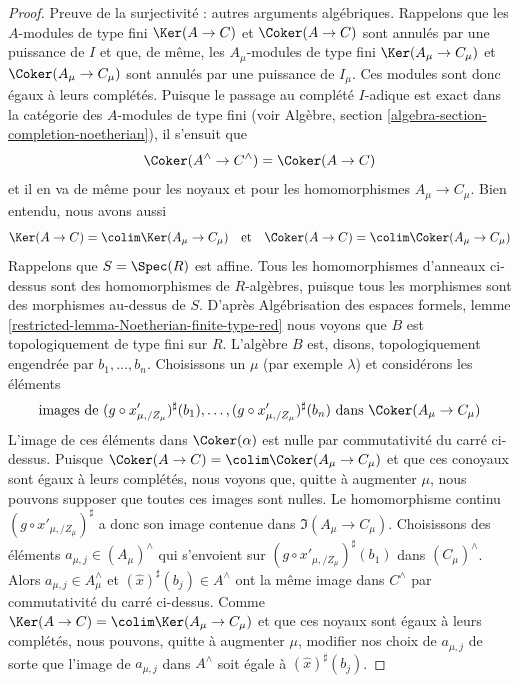 \begin{proof}
\medskip\noindent
Preuve de la surjectivité : autres arguments algébriques. Rappelons que les
$A$-modules de type fini $\Ker(A \to C)$ et $\Coker(A \to C)$ sont annulés
par une puissance de $I$ et que, de même, les $A_\mu$-modules de type fini
$\Ker(A_\mu \to C_\mu)$ et $\Coker(A_\mu \to C_\mu)$ sont annulés
par une puissance de $I_\mu$. Ces modules sont donc égaux
à leurs complétés. Puisque le passage au complété $I$-adique est exact dans
la catégorie des $A$-modules de type fini (voir
Algèbre, section \ref{algebra-section-completion-noetherian}),
il s'ensuit que
$$
\Coker(A^\wedge \to C^\wedge) = \Coker(A \to C)
$$
et il en va de même pour les noyaux et pour les homomorphismes
$A_\mu \to C_\mu$. Bien entendu, nous avons aussi
$$
\Ker(A \to C) = \colim \Ker(A_\mu \to C_\mu)
\quad\text{et}\quad
\Coker(A \to C) = \colim \Coker(A_\mu \to C_\mu)
$$
Rappelons que $S = \Spec(R)$ est affine. Tous les homomorphismes d'anneaux
ci-dessus sont des homomorphismes de $R$-algèbres, puisque tous les morphismes
sont des morphismes au-dessus de $S$. D'après
Algébrisation des espaces formels, lemme
\ref{restricted-lemma-Noetherian-finite-type-red}
nous voyons que $B$ est topologiquement de type fini sur $R$.
L'algèbre $B$ est, disons, topologiquement engendrée par $b_1, \ldots, b_n$.
Choisissons un $\mu$ (par exemple $\lambda$) et considérons
les éléments
$$
\text{images de }
(g \circ x'_{\mu, /Z_\mu})^\sharp(b_1)
, \ldots,
(g \circ x'_{\mu, /Z_\mu})^\sharp(b_n)
\text{ dans }\Coker(A_\mu \to C_\mu)
$$
L'image de ces éléments dans $\Coker(\alpha)$ est nulle
par commutativité du carré ci-dessus. Puisque
$\Coker(A \to C) = \colim \Coker(A_\mu \to C_\mu)$ et que ces
conoyaux sont égaux à leurs complétés,
nous voyons que, quitte à augmenter $\mu$, nous pouvons supposer que toutes ces
images sont nulles. Le homomorphisme continu
$(g \circ x'_{\mu, /Z_\mu})^\sharp$ a donc son image contenue
dans $\Im(A_\mu \to C_\mu)$.
Choisissons des éléments $a_{\mu, j} \in (A_\mu)^\wedge$ qui s'envoient sur
$(g \circ x'_{\mu, /Z_\mu})^\sharp(b_1)$ dans $(C_\mu)^\wedge$.
Alors $a_{\mu, j} \in A_\mu^\wedge$ et $(\hat x)^\sharp(b_j) \in A^\wedge$
ont la même image dans $C^\wedge$ par commutativité du
carré ci-dessus. Comme
$\Ker(A \to C) = \colim \Ker(A_\mu \to C_\mu)$ et que ces noyaux
sont égaux à leurs complétés, nous pouvons, quitte à augmenter
$\mu$, modifier nos choix de $a_{\mu, j}$ de sorte que
l'image de $a_{\mu, j}$ dans $A^\wedge$ soit égale à $(\hat x)^\sharp(b_j)$.


\end{proof}
